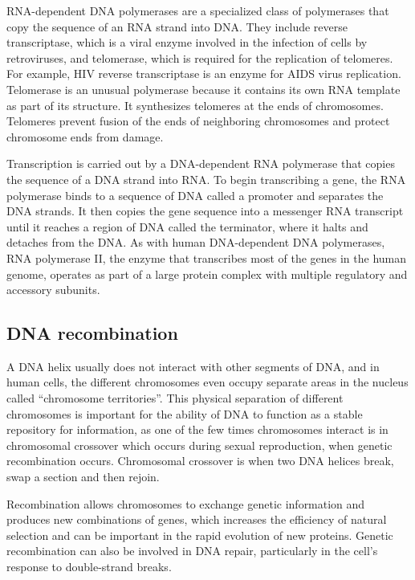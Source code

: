 RNA-dependent DNA polymerases are a specialized class of polymerases that copy the sequence of an RNA strand into DNA. They include reverse transcriptase, which is a viral enzyme involved in the infection of cells by retroviruses, and telomerase, which is required for the replication of telomeres. For example, HIV reverse transcriptase is an enzyme for AIDS virus replication. Telomerase is an unusual polymerase because it contains its own RNA template as part of its structure. It synthesizes telomeres at the ends of chromosomes. Telomeres prevent fusion of the ends of neighboring chromosomes and protect chromosome ends from damage.

Transcription is carried out by a DNA-dependent RNA polymerase that copies the sequence of a DNA strand into RNA. To begin transcribing a gene, the RNA polymerase binds to a sequence of DNA called a promoter and separates the DNA strands. It then copies the gene sequence into a messenger RNA transcript until it reaches a region of DNA called the terminator, where it halts and detaches from the DNA. As with human DNA-dependent DNA polymerases, RNA polymerase II, the enzyme that transcribes most of the genes in the human genome, operates as part of a large protein complex with multiple regulatory and accessory subunits.

\hypertarget{dna-recombination}{%
\subsection{DNA recombination}\label{dna-recombination}}

A DNA helix usually does not interact with other segments of DNA, and in human cells, the different chromosomes even occupy separate areas in the nucleus called ``chromosome territories''. This physical separation of different chromosomes is important for the ability of DNA to function as a stable repository for information, as one of the few times chromosomes interact is in chromosomal crossover which occurs during sexual reproduction, when genetic recombination occurs. Chromosomal crossover is when two DNA helices break, swap a section and then rejoin.

Recombination allows chromosomes to exchange genetic information and produces new combinations of genes, which increases the efficiency of natural selection and can be important in the rapid evolution of new proteins. Genetic recombination can also be involved in DNA repair, particularly in the cell's response to double-strand breaks.

